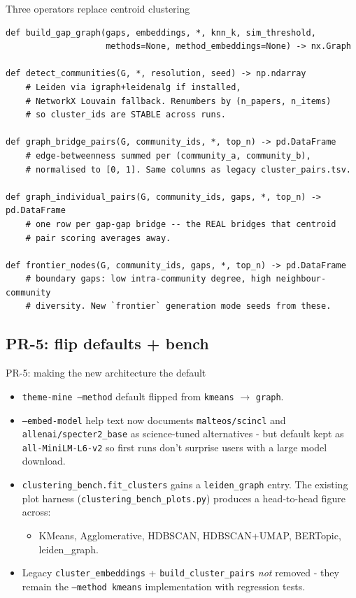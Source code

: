 \documentclass[10pt,aspectratio=169]{beamer}
\newcommand{\filename}[1]{\texttt{\small#1}}
\newcommand{\flag}[1]{\texttt{\small#1}}
\begin{document}
\begin{frame}[fragile]{Three operators replace centroid clustering}
  \scriptsize
  \begin{lstlisting}
def build_gap_graph(gaps, embeddings, *, knn_k, sim_threshold,
                    methods=None, method_embeddings=None) -> nx.Graph

def detect_communities(G, *, resolution, seed) -> np.ndarray
    # Leiden via igraph+leidenalg if installed,
    # NetworkX Louvain fallback. Renumbers by (n_papers, n_items)
    # so cluster_ids are STABLE across runs.

def graph_bridge_pairs(G, community_ids, *, top_n) -> pd.DataFrame
    # edge-betweenness summed per (community_a, community_b),
    # normalised to [0, 1]. Same columns as legacy cluster_pairs.tsv.

def graph_individual_pairs(G, community_ids, gaps, *, top_n) -> pd.DataFrame
    # one row per gap-gap bridge -- the REAL bridges that centroid
    # pair scoring averages away.

def frontier_nodes(G, community_ids, gaps, *, top_n) -> pd.DataFrame
    # boundary gaps: low intra-community degree, high neighbour-community
    # diversity. New `frontier` generation mode seeds from these.
  \end{lstlisting}
\end{frame}


\subsection{PR-5: flip defaults + bench}

\begin{frame}{PR-5: making the new architecture the default}
  \begin{itemize}
    \item \flag{theme-mine --method} default flipped from \texttt{kmeans} $\to$ \texttt{graph}.
    \item \flag{--embed-model} help text now documents \texttt{malteos/scincl}
      and \texttt{allenai/specter2\_base} as science-tuned alternatives -
      but default kept as \texttt{all-MiniLM-L6-v2} so first runs don't
      surprise users with a large model download.
    \item \texttt{clustering\_bench.fit\_clusters} gains a \texttt{leiden\_graph}
      entry. The existing plot harness (\filename{clustering\_bench\_plots.py})
      produces a head-to-head figure across:
      \begin{itemize}
        \scriptsize
        \item KMeans, Agglomerative, HDBSCAN, HDBSCAN+UMAP, BERTopic, \alert{leiden\_graph}.
      \end{itemize}
    \item Legacy \texttt{cluster\_embeddings} + \texttt{build\_cluster\_pairs}
      \emph{not} removed - they remain the \flag{--method kmeans} implementation
      with regression tests.
  \end{itemize}
\end{frame}
\end{document}
